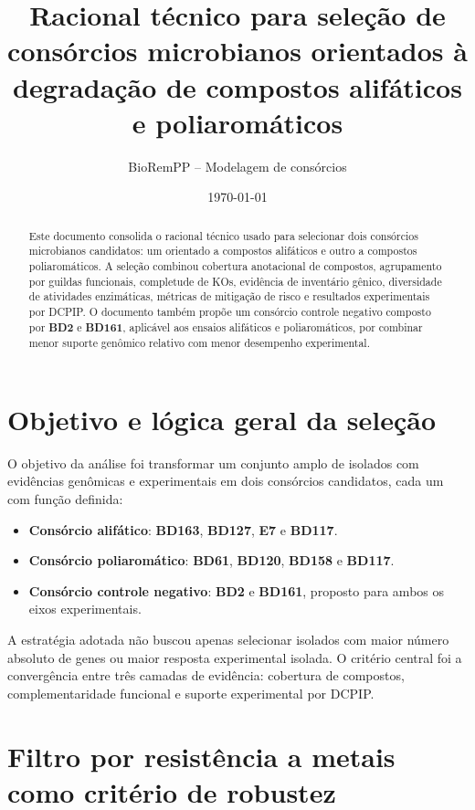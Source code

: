 \documentclass[12pt,a4paper]{article}
\title{Racional técnico para seleção de consórcios microbianos orientados à degradação de compostos alifáticos e poliaromáticos}
\author{BioRemPP -- Modelagem de consórcios}
\date{\today}
\begin{document}
\maketitle

\begin{abstract}
Este documento consolida o racional técnico usado para selecionar dois consórcios microbianos candidatos: um orientado a compostos alifáticos e outro a compostos poliaromáticos. A seleção combinou cobertura anotacional de compostos, agrupamento por guildas funcionais, completude de KOs, evidência de inventário gênico, diversidade de atividades enzimáticas, métricas de mitigação de risco e resultados experimentais por DCPIP. O documento também propõe um consórcio controle negativo composto por \textbf{BD2} e \textbf{BD161}, aplicável aos ensaios alifáticos e poliaromáticos, por combinar menor suporte genômico relativo com menor desempenho experimental.
\end{abstract}

\section{Objetivo e lógica geral da seleção}

O objetivo da análise foi transformar um conjunto amplo de isolados com evidências genômicas e experimentais em dois consórcios candidatos, cada um com função definida:

\begin{itemize}
    \item \textbf{Consórcio alifático}: \textbf{BD163}, \textbf{BD127}, \textbf{E7} e \textbf{BD117}.
    \item \textbf{Consórcio poliaromático}: \textbf{BD61}, \textbf{BD120}, \textbf{BD158} e \textbf{BD117}.
    \item \textbf{Consórcio controle negativo}: \textbf{BD2} e \textbf{BD161}, proposto para ambos os eixos experimentais.
\end{itemize}

A estratégia adotada não buscou apenas selecionar isolados com maior número absoluto de genes ou maior resposta experimental isolada. O critério central foi a convergência entre três camadas de evidência: cobertura de compostos, complementaridade funcional e suporte experimental por DCPIP.

\section{Filtro por resistência a metais como critério de robustez}
\end{document}
